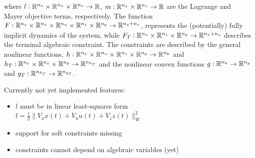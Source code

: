 \documentclass{article}
\begin{document}
where $l\vcentcolon \mathbb{R}^{n_x}\times\mathbb{R}^{n_u}\times\mathbb{R}^{n_z} \rightarrow \mathbb{R}$, $m\vcentcolon \mathbb{R}^{n_x}\times\mathbb{R}^{n_z} \rightarrow \mathbb{R}$ are the Lagrange and Mayer objective terms, respectively. The function $F\vcentcolon \mathbb{R}^{n_x}\times\mathbb{R}^{n_x}\times\mathbb{R}^{n_u}\times\mathbb{R}^{n_z}\times\mathbb{R}^{n_p} \rightarrow \mathbb{R}^{n_x+n_z}$, represents the (potentially) fully implicit dynamics
of the system, while $F_T\vcentcolon \mathbb{R}^{n_x}\times\mathbb{R}^{n_z}\times\mathbb{R}^{n_p} \rightarrow \mathbb{R}^{n_x+n_z}$ describes the terminal algebraic constraint. The constraints are described by the general nonlinear functions, $h\vcentcolon \mathbb{R}^{n_x}\times\mathbb{R}^{n_u}\times\mathbb{R}^{n_z}\times\mathbb{R}^{n_p} \rightarrow \mathbb{R}^{n_h}$ and $h_T\vcentcolon \mathbb{R}^{n_x}\times\mathbb{R}^{n_z}\times\mathbb{R}^{n_p} \rightarrow \mathbb{R}^{n_{h_T}}$ and the nonlinear convex functions $g\vcentcolon \mathbb{R}^{n_h} \rightarrow \mathbb{R}^{n_g}$ and $g_T\vcentcolon \mathbb{R}^{n_{h_T}} \rightarrow \mathbb{R}^{n_{g_T}}$. 
\par
\vspace{0.2cm}
Currently not yet implemented features:
\begin{itemize}
    \item $l$ must be in linear least-squares form $l = \frac{1}{2}\| V_x x(t) + V_u u(t) + V_z z(t)\|_W^2$ 
    \item support for soft constraints missing 
    \item constraints cannot depend on algebraic variables (yet)

\end{itemize}
\end{document}
